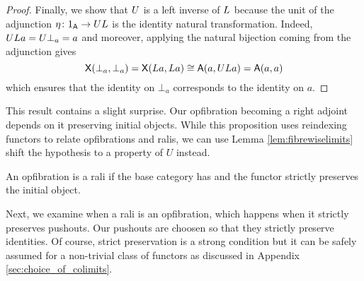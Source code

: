 \documentclass{amsart}
\begin{document}
\begin{proof}

Finally, we show that $U$ is a left inverse of $L$ because the unit of the adjunction $\eta\colon 1_{\mathsf{A}} \to UL$ is the identity natural transformation. Indeed, $UL a=U\bot_a=a$ and moreover, applying the natural bijection coming from the adjunction gives \[\mathsf{X} (\bot_a,\bot_a)=\mathsf{X} (L a,L a)\cong\mathsf{A}(a,UL a)=\mathsf{A} (a,a)\] which ensures that the identity on $\bot_a$ corresponds to the identity on $a$.
\end{proof}

This result contains a slight surprise. Our opfibration becoming a right adjoint depends on it preserving initial objects. While this proposition
uses reindexing functors to relate opfibrations and ralis, we can use Lemma \ref{lem:fibrewiselimits} shift the hypothesis to a property of $U$ instead.

\begin{cor}
  An opfibration is a rali if the base category has and the functor strictly preserves the initial object.
\end{cor}

Next, we examine when a rali is an opfibration, which happens when it
strictly preserves pushouts. Our pushouts are choosen so that they strictly
preserve identities. Of course, strict preservation is a strong condition but it
can be safely assumed for a non-trivial class of functors as discussed in Appendix \ref{sec:choice_of_colimits}.
\end{document}
